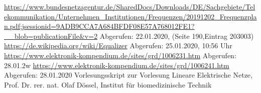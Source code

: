 \begin{thebibliography}{99}

 \url{https://www.bundesnetzagentur.de/SharedDocs/Downloads/DE/Sachgebiete/Telekommunikation/Unternehmen_Institutionen/Frequenzen/20191202_Frequenzplan.pdf;jsessionid=9ADB9CCA7A684BFDF08E57A768012FE1?__blob=publicationFile&v=2} Abgerufen: 22.01.2020, (Seite 190,Eintrag 203003)
 \url{https://de.wikipedia.org/wiki/Equalizer} Abgerufen: 25.01.2020, 10:56 Uhr
 \url{https://www.elektronik-kompendium.de/sites/grd/1006231.htm}
Abgerufen: 28.01.2w
 \url{https://www.elektronik-kompendium.de/sites/grd/1006241.htm} Abgerufen: 28.01.2020
 Vorlesungsskript zur Vorlesung Lineare Elektrische Netze, Prof. Dr. rer. nat. Olaf Dössel, Institut für biomedizinische Technik







\end{thebibliography}

